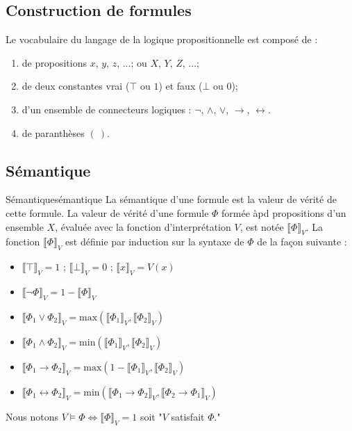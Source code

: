 \subsection{Construction de formules}
Le vocabulaire du langage de la logique propositionnelle est composé de :
\begin{enumerate}
  \item de propositions $x$, $y$, $z$, ...; ou $X$, $Y$, $Z$, ...;
  \item de deux constantes vrai ($\top$ ou $1$) et faux ($\bot$ ou $0$);
  \item d'un ensemble de connecteurs logiques : $\neg$, $\wedge$, $\vee$, $\rightarrow$, $\leftrightarrow$.
  \item de paranthèses $(\ )$.
\end{enumerate}


\subsection{Sémantique}
\begin{definition}{Sémantique}{sémantique}
La sémantique d'une formule est la valeur de vérité de cette formule. La valeur de vérité d'une formule
$\Phi$ formée àpd propositions d'un ensemble $X$, évaluée avec la fonction d'interprétation $V$, est notée $\llbracket \Phi \rrbracket_V$.
La fonction $\llbracket \Phi \rrbracket_V$ est définie par induction sur la syntaxe de $\Phi$ de la façon suivante :
\begin{itemize}[label=$\bullet$]
  \item $\llbracket \top\rrbracket_V = 1$ ; $\llbracket \bot\rrbracket_V = 0$ ; $\llbracket x\rrbracket_V = V(x)$
  \item $\llbracket \neg \Phi\rrbracket_V = 1 - \llbracket \Phi\rrbracket_V$
  \item $\llbracket \Phi_1 \vee \Phi_2\rrbracket_V = \text{max}(\llbracket\Phi_1\rrbracket_V,\llbracket\Phi_2\rrbracket_V)$
  \item $\llbracket \Phi_1 \land \Phi_2\rrbracket_V = \text{min}(\llbracket\Phi_1\rrbracket_V,\llbracket\Phi_2\rrbracket_V)$
  \item $\llbracket \Phi_1 \rightarrow \Phi_2\rrbracket_V = \text{max}(1 - \llbracket\Phi_1\rrbracket_V,\llbracket\Phi_2\rrbracket_V)$
  \item $\llbracket \Phi_1 \leftrightarrow \Phi_2\rrbracket_V = \text{min}(\llbracket\Phi_1\rightarrow\Phi_2\rrbracket_V,\llbracket\Phi_2\rightarrow\Phi_1\rrbracket_V)$
\end{itemize}
Nous notons $V\vDash\Phi\Leftrightarrow\llbracket\Phi\rrbracket_V=1$ soit "$V$ satisfait $\Phi$."
\end{definition}

